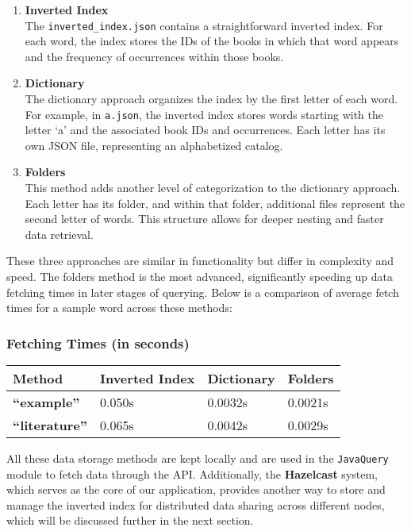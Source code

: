 \begin{enumerate}
\def\labelenumi{\arabic{enumi}.}
\item
  \textbf{Inverted Index}\\
  The \texttt{inverted\_index.json} contains a straightforward inverted
  index. For each word, the index stores the IDs of the books in which
  that word appears and the frequency of occurrences within those books.
\item
  \textbf{Dictionary}\\
  The dictionary approach organizes the index by the first letter of
  each word. For example, in \texttt{a.json}, the inverted index stores
  words starting with the letter `a' and the associated book IDs and
  occurrences. Each letter has its own JSON file, representing an
  alphabetized catalog.
\item
  \textbf{Folders}\\
  This method adds another level of categorization to the dictionary
  approach. Each letter has its folder, and within that folder,
  additional files represent the second letter of words. This structure
  allows for deeper nesting and faster data retrieval.
\end{enumerate}

These three approaches are similar in functionality but differ in
complexity and speed. The folders method is the most advanced,
significantly speeding up data fetching times in later stages of
querying. Below is a comparison of average fetch times for a sample word
across these methods:

\hypertarget{fetching-times-in-seconds}{%
\subsubsection{Fetching Times (in
seconds)}\label{fetching-times-in-seconds}}

\begin{longtable}[]{@{}llll@{}}
\toprule
Method & Inverted Index & Dictionary & Folders \\
\midrule
\endhead
\textbf{``example''} & 0.050s & 0.0032s & 0.0021s \\
\textbf{``literature''} & 0.065s & 0.0042s & 0.0029s \\
\bottomrule
\end{longtable}

All these data storage methods are kept locally and are used in the
\texttt{JavaQuery} module to fetch data through the API. Additionally,
the \textbf{Hazelcast} system, which serves as the core of our
application, provides another way to store and manage the inverted index
for distributed data sharing across different nodes, which will be
discussed further in the next section.

